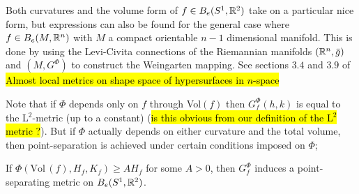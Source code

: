 \begin{remark}
Both curvatures and the volume form of $f \in B_e(S^1,\mathbb{R}^2)$ take on a particular nice form, but expressions can also be found for the general case where $f \in  B_e(M, \mathbb{R}^n)$ with $M$ a compact orientable $n-1$ dimensional manifold. This is done by using the Levi-Civita connections of the Riemannian manifolds $(\mathbb{R}^n,\bar{g})$ and $(M,G^\Phi)$ to construct the Weingarten mapping. See sections $3.4$ and $3.9$ of \hl{Almost local metrics on shape space of hypersurfaces in $n$-space}   
\end{remark}

Note that if $\Phi$ depends only on $f$ through Vol$(f)$ then $G_f^\Phi (h,k)$ is equal to the L$^2$-metric (up to a constant) (\hl{is this obvious from our definition of the L$^2$ metric ?}). But if $\Phi$ actually depends on either curvature and the total volume, then point-separation is achieved under certain conditions imposed on $\Phi$;

\begin{theorem}\label{point_sep}
If $\Phi(\text{Vol} \, (f), H_f, K_f) \geq A H_f$ for some $A > 0$, then $G_f^\Phi$ induces a point-separating metric on $B_e(S^1, \mathbb{R}^2)$.
\end{theorem}


